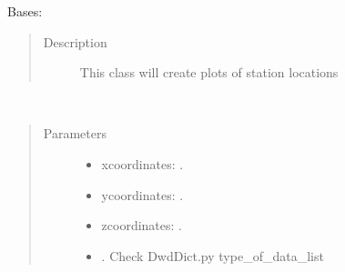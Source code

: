 \documentclass[letterpaper,10pt,english]{sphinxmanual}
\begin{document}
\begin{fulllineitems}
\label{\detokenize{DwdPlotter:DwdPlotter.PlotterForStations}}
\sphinxAtStartPar
Bases: 
\begin{quote}\begin{description}
\item[{Description}] \leavevmode
\sphinxAtStartPar
This class will create plots of station locations

\end{description}\end{quote}

\begin{fulllineitems}
\label{\detokenize{DwdPlotter:DwdPlotter.PlotterForStations.__init__}}~\begin{quote}\begin{description}
\item[{Parameters}] \leavevmode\begin{itemize}
\item {} 
\sphinxAtStartPar
{} \textendash{} x\sphinxhyphen{}coordinates: .

\item {} 
\sphinxAtStartPar
{} \textendash{} y\sphinxhyphen{}coordinates: .

\item {} 
\sphinxAtStartPar
{} \textendash{} z\sphinxhyphen{}coordinates: .

\item {} 
\sphinxAtStartPar
{} \textendash{} . Check DwdDict.py type\_of\_data\_list


\end{itemize}
\end{description}
\end{quote}
\end{fulllineitems}
\end{fulllineitems}
\end{document}
